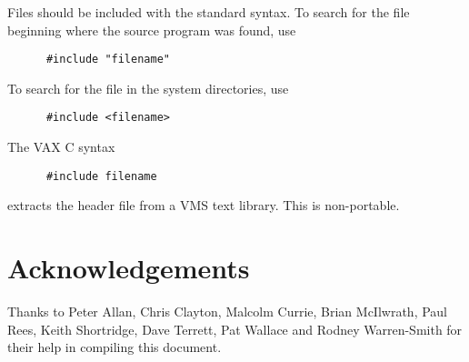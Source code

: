 Files should be included with the standard syntax.  To search for the file 
beginning where the source program was found, use
\begin{verbatim}
      #include "filename"
\end{verbatim}
 
To search for the file in the system directories, use
\begin{verbatim}
      #include <filename>
\end{verbatim}

The VAX C syntax 
\begin{verbatim}
      #include filename
\end{verbatim}
extracts the header file from a VMS text library. This is non-portable.


\section{Acknowledgements}

Thanks to Peter Allan, Chris Clayton, Malcolm Currie, Brian McIlwrath, Paul 
Rees, Keith Shortridge, Dave Terrett, Pat Wallace and 
Rodney Warren-Smith for their help in compiling this document.



